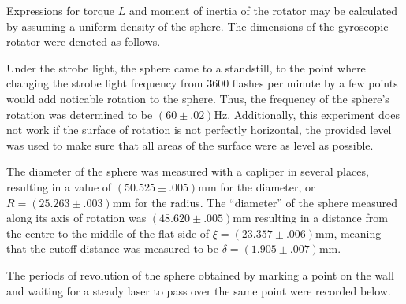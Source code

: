 \begin{paper}
	Expressions for torque \( L \) and moment of inertia of the rotator may be calculated by assuming a uniform density of the sphere. The dimensions of the gyroscopic rotator were denoted as follows.\\
	

	
Under the strobe light, the sphere came to a standstill, to the point where changing the strobe light frequency from 3600 flashes per minute by a few points would add noticable rotation to the sphere.
Thus, the frequency of the sphere's rotation was determined to be $(60\pm.02)\si{\hertz}$.
Additionally, this experiment does not work if the surface of rotation is not perfectly horizontal, the provided level was used to make sure that all areas of the surface were as level as possible.

The diameter of the sphere was measured with a capliper in several places, resulting in a value of $(50.525\pm.005)\si{\milli\meter}$ for the diameter, or $R=(25.263\pm.003)\si{\milli\meter}$ for the radius.
The ``diameter'' of the sphere measured along its axis of rotation was $(48.620\pm.005)\si{\milli\meter}$ resulting in a distance from the centre to the middle of the flat side of $\xi=(23.357\pm.006)\si{\milli\meter}$, meaning that the cutoff distance was measured to be $\delta=(1.905\pm.007)\si{\milli\meter}$.

The periods of revolution of the sphere obtained by marking a point on the wall and waiting for a steady laser to pass over the same point were recorded below.\\


\end{paper}
